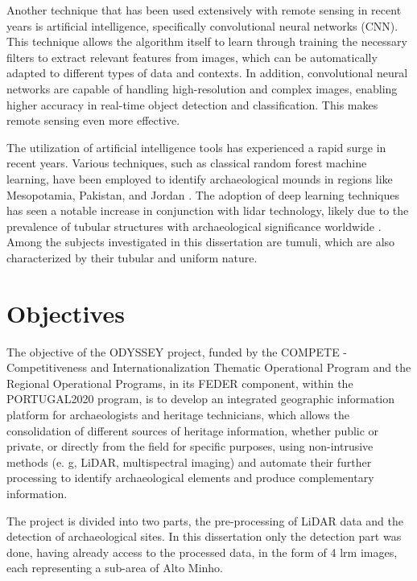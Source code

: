 Another technique that has been used extensively with remote sensing in recent years is artificial intelligence, specifically convolutional neural networks (CNN). This technique allows the algorithm itself to learn through training the necessary filters to extract relevant features from images, which can be automatically adapted to different types of data and contexts. In addition, convolutional neural networks are capable of handling high-resolution and complex images, enabling higher accuracy in real-time object detection and classification. This makes remote sensing even more effective.


The utilization of artificial intelligence tools has experienced a rapid surge in recent years\cite{aumentoexpDL}. Various techniques, such as classical random forest machine learning, have been employed to identify archaeological mounds in regions like Mesopotamia, Pakistan, and Jordan \cite{LIDARCOMDL}. The adoption of deep learning techniques has seen a notable increase in conjunction with \ac{lidar} technology, likely due to the prevalence of tubular structures with archaeological significance worldwide \cite{LIDARCOMDL}. Among the subjects investigated in this dissertation are tumuli, which are also characterized by their tubular and uniform nature.


\section{Objectives}
The objective of the ODYSSEY project, funded by the COMPETE - Competitiveness and Internationalization Thematic Operational Program and the Regional Operational Programs, in its FEDER component, within the PORTUGAL2020 program, is to develop an integrated geographic information platform for archaeologists and heritage technicians, which allows the consolidation of different sources of heritage information, whether public or private, or directly from the field for specific purposes, using non-intrusive methods (e. g, LiDAR, multispectral imaging) and automate their further processing to identify archaeological elements and produce complementary information.

The project is divided into two parts, the pre-processing of LiDAR data and the detection of archaeological sites. In this dissertation only the detection part was done, having already access to the processed data, in the form of 4 \ac{lrm} images, each representing a sub-area of Alto Minho.



